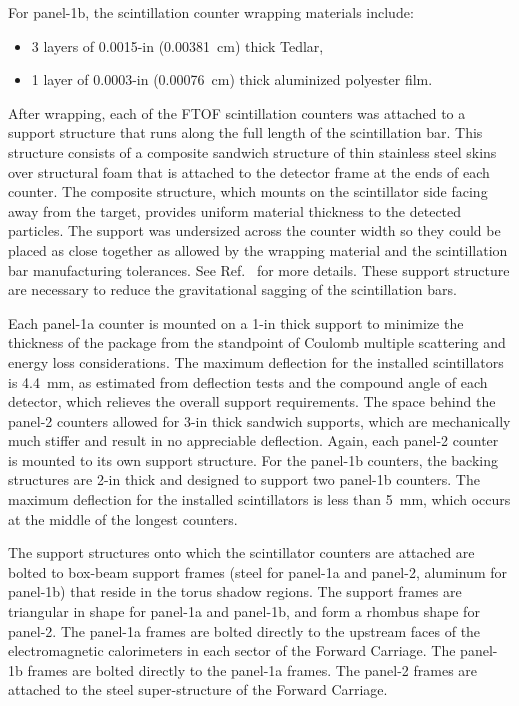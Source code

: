 \documentclass{elsart}
\begin{document}
\noindent
For panel-1b, the scintillation counter wrapping materials include:

\begin{itemize}
\item 3 layers of 0.0015-in (0.00381~cm) thick Tedlar,
\item 1 layer of 0.0003-in (0.00076~cm) thick aluminized polyester film.
\end{itemize}

After wrapping, each of the FTOF scintillation counters was attached to a support structure that runs along
the full length of the scintillation bar. This structure consists of a composite sandwich structure of thin stainless
steel skins over structural foam that is attached to the detector frame at the ends of each counter. The composite
structure, which mounts on the scintillator side facing away from the target, provides uniform material thickness
to the detected particles.  The support was undersized across the counter width so they could be placed as close
together as allowed by the wrapping material and the scintillation bar manufacturing tolerances. See
Ref.~\cite{tof-nim} for more details. These support structure are necessary to reduce the gravitational sagging of
the scintillation bars.

Each panel-1a counter is mounted on a 1-in thick support to minimize the thickness of the package from
the standpoint of Coulomb multiple scattering and energy loss considerations.  The maximum deflection
for the installed scintillators is 4.4~mm, as estimated from deflection tests and the compound angle of
each detector, which relieves the overall support requirements. The space behind the panel-2 counters
allowed for 3-in thick sandwich supports, which are mechanically much stiffer and result in no appreciable
deflection. Again, each panel-2 counter is mounted to its own support structure. For the panel-1b counters,
the backing structures are 2-in thick and designed to support two panel-1b counters. The maximum
deflection for the installed scintillators is less than 5~mm, which occurs at the middle of the longest
counters.

The support structures onto which the scintillator counters are attached are bolted to box-beam support
frames (steel for panel-1a and panel-2, aluminum for panel-1b) that reside in the torus shadow regions.
The support frames are triangular in shape for panel-1a and panel-1b, and form a rhombus shape for
panel-2. The panel-1a frames are bolted directly to the upstream faces of the electromagnetic
calorimeters in each sector of the Forward Carriage. The panel-1b frames are bolted directly to the
panel-1a frames. The panel-2 frames are attached to the steel super-structure of the Forward Carriage.
\end{document}
